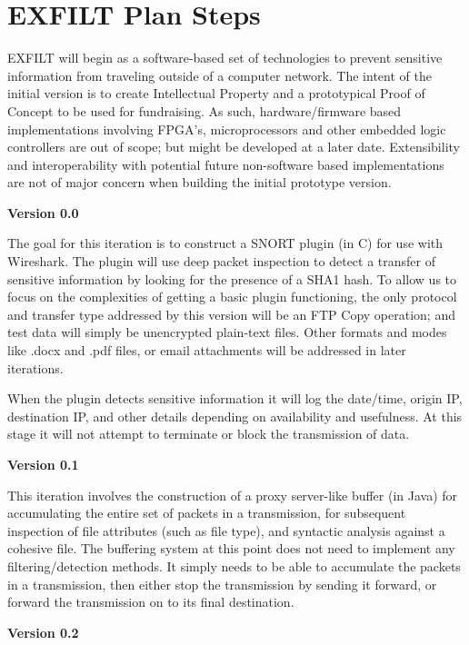 \chapter{EXFILT Plan Steps}
EXFILT will begin as a software-based set of technologies to prevent
sensitive information from traveling outside of a computer network.
The intent of the initial version is to create Intellectual Property
and a prototypical Proof of Concept to be used for fundraising.  As
such, hardware/firmware based implementations involving FPGA’s,
microprocessors and other embedded logic controllers are out of scope;
but might be developed at a later date.  Extensibility and
interoperability with potential future non-software based
implementations are not of major concern when building the initial
prototype version.

\vspace{2mm}
\noindent
{\bf Version 0.0}

The goal for this iteration is to construct a SNORT plugin (in C) for
use with Wireshark.  The plugin will use deep packet inspection to
detect a transfer of sensitive information by looking for the presence
of a SHA1 hash.  To allow us to focus on the complexities of getting a
basic plugin functioning, the only protocol and transfer type
addressed by this version will be an FTP Copy operation; and test data
will simply be unencrypted plain-text files.  Other formats and modes
like .docx and .pdf files, or email attachments will be addressed in
later iterations.

When the plugin detects sensitive information it will log the
date/time, origin IP, destination IP, and other details depending on
availability and usefulness.  At this stage it will not attempt to
terminate or block the transmission of data.

\vspace{2mm}
\noindent
{\bf Version 0.1}

This iteration involves the construction of a proxy server-like buffer
(in Java) for accumulating the entire set of packets in a
transmission, for subsequent inspection of file attributes (such as
file type), and syntactic analysis against a cohesive file.  The
buffering system at this point does not need to implement any
filtering/detection methods.  It simply needs to be able to accumulate
the packets in a transmission, then either stop the transmission by
sending it forward, or forward the transmission on to its final
destination.

\vspace{2mm}
\noindent
{\bf Version 0.2}

